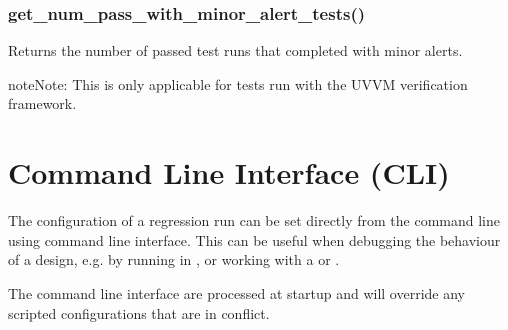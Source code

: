 \documentclass[letterpaper,10pt,english]{sphinxmanual}
\begin{document}
\subsection{get\_num\_pass\_with\_minor\_alert\_tests()}
\label{\detokenize{api:get-num-pass-with-minor-alert-tests}}
\sphinxAtStartPar
Returns the number of passed test runs that completed with minor alerts.

\begin{sphinxadmonition}{note}{Note:}
\sphinxAtStartPar
This is only applicable for tests run with the UVVM verification framework.
\end{sphinxadmonition}

\begin{sphinxVerbatim}[commandchars=\\\{\}]
\end{sphinxVerbatim}

\sphinxAtStartPar
{}

\begin{sphinxVerbatim}[commandchars=\\\{\}]
  
\end{sphinxVerbatim}

\sphinxstepscope


\chapter{Command Line Interface (CLI)}
\label{\detokenize{cli:command-line-interface-cli}}\label{\detokenize{cli::doc}}
\begin{DUlineblock}{0em}
\item[] The configuration of a regression run can be set directly from the command line using command line interface.
This can be useful when debugging the behaviour of a design, e.g. by running in {\hyperref[\detokenize{gui::doc}]{}},
or working with a {\hyperref[\detokenize{intro:testcase}]{}} or {\hyperref[\detokenize{intro:test-group}]{}}.
\item[] The command line interface are processed at startup and will override any scripted configurations that are in conflict.
\end{DUlineblock}
\end{document}
